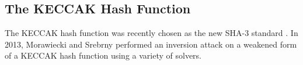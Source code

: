 \subsection{The KECCAK Hash Function}
The KECCAK hash function was recently chosen as the new SHA-3 standard \cite{USDOC15}. In 2013, Morawiecki and Srebrny \cite{MS13} performed an inversion attack on a weakened form of a {KECCAK} hash function using a variety of solvers. 